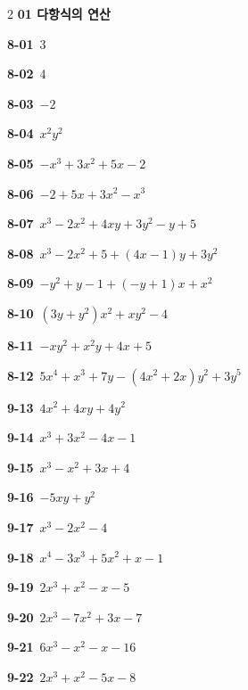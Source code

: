 \documentclass[10pt,a4paper]{article}
\newcommand{\dmsection}[1]{\par\needspace{10\baselineskip}\vspace{3mm}\noindent{\color{dm-navy}\hrule height 0.6pt}\vspace{1.2mm}\noindent{\dmheadingfont\bfseries\fontsize{11}{13}\selectfont\color{dm-navy}#1}\par\vspace{2mm}}
\begin{document}
\vspace{4mm}\setcounter{dmproblemcount}{15}\vspace{6mm}
\vspace{4mm}\setcounter{dmproblemcount}{16}\vspace{6mm}
\vspace{4mm}\setcounter{dmproblemcount}{17}\vspace{6mm}
\vspace*{0pt plus 1filll}
\clearpage
\dmsection{정답}
\begin{multicols}{2}\small
\noindent\textbf{01 다항식의 연산}\par\smallskip
\noindent\textbf{8-01}\ 3\par
\noindent\textbf{8-02}\ 4\par
\noindent\textbf{8-03}\ $-2$\par
\noindent\textbf{8-04}\ $x^2y^2$\par
\noindent\textbf{8-05}\ $-x^3+3x^2+5x-2$\par
\noindent\textbf{8-06}\ $-2+5x+3x^2-x^3$\par
\noindent\textbf{8-07}\ $x^3-2x^2+4xy+3y^2-y+5$\par
\noindent\textbf{8-08}\ $x^3-2x^2+5+(4x-1)y+3y^2$\par
\noindent\textbf{8-09}\ $-y^2+y-1+(-y+1)x+x^2$\par
\noindent\textbf{8-10}\ $(3y+y^2)x^2+xy^2-4$\par
\noindent\textbf{8-11}\ $-xy^2+x^2y+4x+5$\par
\noindent\textbf{8-12}\ $5x^4+x^3+7y-(4x^2+2x)y^2+3y^5$\par
\noindent\textbf{9-13}\ $4x^2+4xy+4y^2$\par
\noindent\textbf{9-14}\ $x^3+3x^2-4x-1$\par
\noindent\textbf{9-15}\ $x^3-x^2+3x+4$\par
\noindent\textbf{9-16}\ $-5xy+y^2$\par
\noindent\textbf{9-17}\ $x^3-2x^2-4$\par
\noindent\textbf{9-18}\ $x^4-3x^3+5x^2+x-1$\par
\noindent\textbf{9-19}\ $2x^3+x^2-x-5$\par
\noindent\textbf{9-20}\ $2x^3-7x^2+3x-7$\par
\noindent\textbf{9-21}\ $6x^3-x^2-x-16$\par
\noindent\textbf{9-22}\ $2x^3+x^2-5x-8$\par

\end{multicols}
\end{document}
